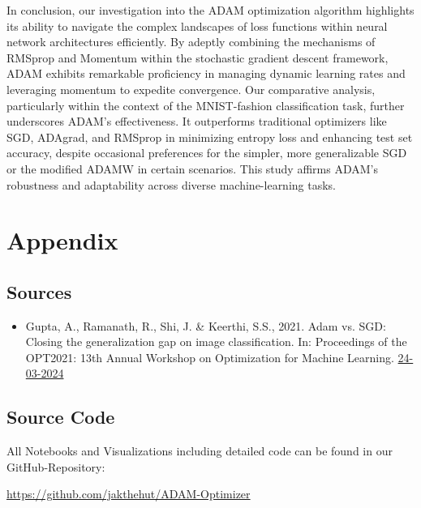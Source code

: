 \documentclass[oneside]{article}
\begin{document}
In conclusion, our investigation into the ADAM optimization algorithm highlights its ability to navigate the complex landscapes of loss functions within neural network architectures efficiently. By adeptly combining the mechanisms of RMSprop and Momentum within the stochastic gradient descent framework, ADAM exhibits remarkable proficiency in managing dynamic learning rates and leveraging momentum to expedite convergence. Our comparative analysis, particularly within the context of the MNIST-fashion classification task, further underscores ADAM's effectiveness. It outperforms traditional optimizers like SGD, ADAgrad, and RMSprop in minimizing entropy loss and enhancing test set accuracy, despite occasional preferences for the simpler, more generalizable SGD or the modified ADAMW in certain scenarios. This study affirms ADAM's robustness and adaptability across diverse machine-learning tasks.




\onecolumn
\newpage
\pagestyle{fancy}


\section{Appendix}
\subsection{Sources}
\begin{itemize}
    \item Gupta, A., Ramanath, R., Shi, J. \& Keerthi, S.S., 2021. Adam vs. SGD: Closing the generalization gap on image classification. In: Proceedings of the OPT2021: 13th Annual Workshop on Optimization for Machine Learning. \href{chrome-extension://efaidnbmnnnibpcajpcglclefindmkaj/https://opt-ml.org/papers/2021/paper53.pdf}{24-03-2024}
\end{itemize}

\subsection{Source Code}
All Notebooks and Visualizations including detailed code can be found in our GitHub-Repository:\par
\href{https://github.com/jakthehut/ADAM-Optimizer}{https://github.com/jakthehut/ADAM-Optimizer}
\end{document}
